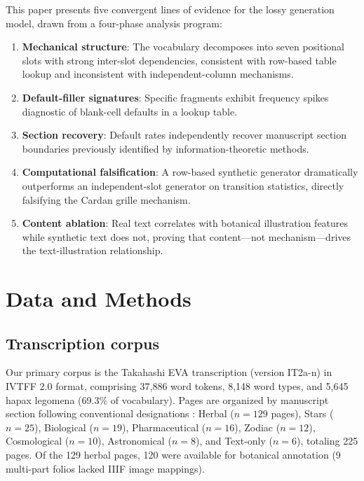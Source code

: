 \documentclass[12pt]{article}
\begin{document}
This paper presents five convergent lines of evidence for the lossy generation model, drawn from a four-phase analysis program:
\begin{enumerate}
  \item \textbf{Mechanical structure}: The vocabulary decomposes into seven positional slots with strong inter-slot dependencies, consistent with row-based table lookup and inconsistent with independent-column mechanisms.
  \item \textbf{Default-filler signatures}: Specific fragments exhibit frequency spikes diagnostic of blank-cell defaults in a lookup table.
  \item \textbf{Section recovery}: Default rates independently recover manuscript section boundaries previously identified by information-theoretic methods.
  \item \textbf{Computational falsification}: A row-based synthetic generator dramatically outperforms an independent-slot generator on transition statistics, directly falsifying the Cardan grille mechanism.
  \item \textbf{Content ablation}: Real text correlates with botanical illustration features while synthetic text does not, proving that content---not mechanism---drives the text-illustration relationship.
\end{enumerate}

\section{Data and Methods}
\label{sec:methods}

\subsection{Transcription corpus}

Our primary corpus is the Takahashi EVA transcription (version IT2a-n) in IVTFF 2.0 format, comprising 37,886 word tokens, 8,148 word types, and 5,645 hapax legomena (69.3\% of vocabulary). Pages are organized by manuscript section following conventional designations \citep[see][for a comprehensive overview]{Zandbergen2021}: Herbal ($n = 129$ pages), Stars ($n = 25$), Biological ($n = 19$), Pharmaceutical ($n = 16$), Zodiac ($n = 12$), Cosmological ($n = 10$), Astronomical ($n = 8$), and Text-only ($n = 6$), totaling 225 pages. Of the 129 herbal pages, 120 were available for botanical annotation (9 multi-part folios lacked IIIF image mappings).
\end{document}
